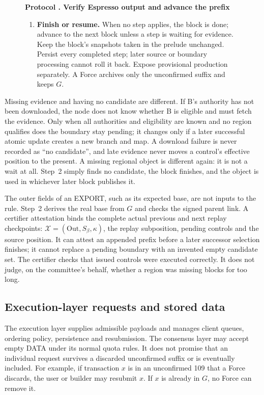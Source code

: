 \documentclass[11pt,a4paper]{article}
\newcounter{protocol}
\newenvironment{protocol}[3][htbp]{\begin{figure}[#1]\refstepcounter{protocol}\label{#2}
\begin{mdframed}[linewidth=.6pt,skipabove=0pt,skipbelow=0pt,
innertopmargin=7pt,innerbottommargin=7pt]\small
\textbf{Protocol \theprotocol. #3}\par\smallskip}{\end{mdframed}\end{figure}}
\begin{document}
\begin{protocol}{alg:external}{Verify Espresso output and advance the prefix}
\begin{enumerate}[label=\textbf{\arabic*)},itemsep=3pt]
\item \textbf{Finish or resume.} When no step applies, the block is
done; advance to the next block unless a step is waiting for evidence.
Keep the block's snapshots taken in the prelude unchanged. Persist every
completed step; later source or boundary processing cannot roll it back.
Expose provisional production separately. A Force archives only the
unconfirmed suffix and keeps $G$.
\end{enumerate}
\end{protocol}

Missing evidence and having no candidate are different. If B's authority
has not been downloaded, the node does not know whether B is eligible and
must fetch the evidence. Only when all authorities and eligibility are
known and no region qualifies does the boundary stay pending; it changes
only if a later successful atomic update creates a new branch and map. A
download failure is never recorded as ``no candidate'',
and late evidence never moves a control's effective position to the
present. A missing regional object is different again: it is not a wait
at all. Step~2 simply finds no candidate, the block finishes, and the
object is used in whichever later block publishes it.

The outer fields of an EXPORT, such as its expected base, are not inputs
to the rule. Step~2 derives the real base from $G$ and checks the signed
parent link. A certifier attestation binds the complete actual previous
and next replay checkpoints: $\mathcal X=(\mathrm{Out},S_\beta,\kappa)$,
the replay subposition, pending controls and the source position. It can attest an
appended prefix before a later successor selection finishes; it cannot
replace a pending boundary with an invented empty candidate set. The certifier
checks that issued controls were executed correctly. It does not judge,
on the committee's behalf, whether a region was missing blocks for too
long.

\subsection{Execution-layer requests and stored data}
\label{sec:requests}
The execution layer supplies admissible payloads and manages client
queues, ordering policy, persistence and resubmission. The consensus
layer may accept empty DATA under its normal quota rules. It does not
promise that an individual request survives a discarded unconfirmed
suffix or is eventually included. For example, if transaction $x$ is in
an unconfirmed 109 that a Force discards, the user or builder may
resubmit $x$. If $x$ is already in $G$, no Force can remove it.
\end{document}
